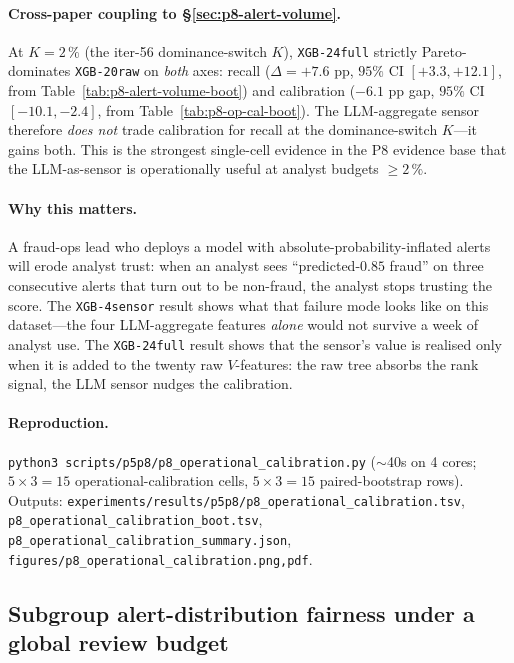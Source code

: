 \paragraph{Cross-paper coupling to \S\ref{sec:p8-alert-volume}.}
At $K{=}2\,\%$ (the iter-56 dominance-switch $K$), \texttt{XGB-24full}
strictly Pareto-dominates \texttt{XGB-20raw} on \emph{both} axes: recall
($\Delta = +7.6$ pp, $95\%$ CI $[+3.3, +12.1]$, from
Table~\ref{tab:p8-alert-volume-boot}) and calibration ($-6.1$ pp gap,
$95\%$ CI $[-10.1, -2.4]$, from
Table~\ref{tab:p8-op-cal-boot}). The LLM-aggregate sensor therefore
\emph{does not} trade calibration for recall at the dominance-switch
$K$---it gains both. This is the strongest single-cell evidence in the
P8 evidence base that the LLM-as-sensor is operationally useful at
analyst budgets $\ge 2\,\%$.

\paragraph{Why this matters.}
A fraud-ops lead who deploys a model with absolute-probability-inflated
alerts will erode analyst trust: when an analyst sees
``predicted-$0.85$ fraud'' on three consecutive alerts that turn out to
be non-fraud, the analyst stops trusting the score. The
\texttt{XGB-4sensor} result shows what that failure mode looks like on
this dataset---the four LLM-aggregate features \emph{alone} would not
survive a week of analyst use. The \texttt{XGB-24full} result shows
that the sensor's value is realised only when it is added to the twenty
raw $V$-features: the raw tree absorbs the rank signal, the LLM sensor
nudges the calibration.

\paragraph{Reproduction.}
\texttt{python3 scripts/p5p8/p8\_operational\_calibration.py} ($\sim$40s
on 4 cores; $5 \times 3 = 15$ operational-calibration cells, $5 \times
3 = 15$ paired-bootstrap rows). Outputs:
\texttt{experiments/results/p5p8/p8\_operational\_calibration.tsv},
\texttt{p8\_operational\_calibration\_boot.tsv},
\texttt{p8\_operational\_calibration\_summary.json},
\texttt{figures/p8\_operational\_calibration.{png,pdf}}.

\subsection{Subgroup alert-distribution fairness under a global review budget}
\label{sec:p8-subgroup-fairness}

